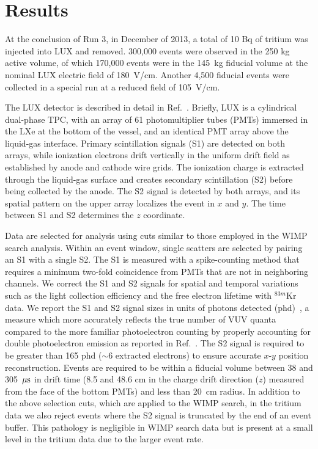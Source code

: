 \section{Results}

At the conclusion of Run 3, in December of 2013, a total of 10 Bq of tritium was injected into LUX and removed. 300,000 events were observed in the 250 kg active volume, of which 170,000 events were in the 145~kg fiducial volume at the nominal LUX electric field of 180~V/cm. Another 4,500 fiducial events were collected in a special run at a reduced field of 105~V/cm. 

The LUX detector is described in detail in Ref.~\cite{lux-nim}. Briefly, LUX is a cylindrical dual-phase TPC, with an array of 61 photomultiplier tubes (PMTs) immersed in the LXe at the bottom of the vessel, and an identical PMT array above the liquid-gas interface. Primary scintillation signals (S1) are detected on both arrays, while ionization electrons drift vertically in the uniform drift field as established by anode and cathode wire grids. The ionization charge is extracted through the liquid-gas surface and creates secondary scintillation (S2) before being collected by the anode. The S2 signal is detected by both arrays, and its spatial pattern on the upper array localizes the event in $x$ and $y$. The time between S1 and S2 determines the $z$ coordinate.

Data are selected for analysis using cuts similar to those employed in the WIMP search analysis\cite{lux-reanalysis, lux-prd}. Within an event window, single scatters are selected by pairing an S1 with a single S2.  The S1 is measured with a spike-counting method that requires a minimum two-fold coincidence from PMTs that are not in neighboring channels. We correct the S1 and S2 signals for spatial and temporal variations such as the light collection efficiency and the free electron lifetime with $ ^{83m}$Kr data.  We report the S1 and 
S2 signal sizes in units of photons detected (phd)~\cite{lux-reanalysis}, a measure which more accurately reflects the true number of VUV quanta compared to the more familiar photoelectron counting by properly accounting for double photoelectron emission as reported in Ref.~\cite{doublepe}. The S2 signal is required to be greater than 165 phd ($\sim$6 extracted electrons) to ensure accurate $x$-$y$ position reconstruction. Events are required to be within a fiducial volume between 38 and 305~$\rm \mu s$ in drift time (8.5 and 48.6 cm in the charge drift direction ($z$) measured from the face of the bottom PMTs) and less than 20~cm radius. In addition to the above selection cuts, which are applied to the WIMP search, in the tritium data we also reject events where the S2 signal is truncated by the end of an event buffer. This pathology is negligible in WIMP search data but is present at a small level in the tritium data due to the larger event rate.

